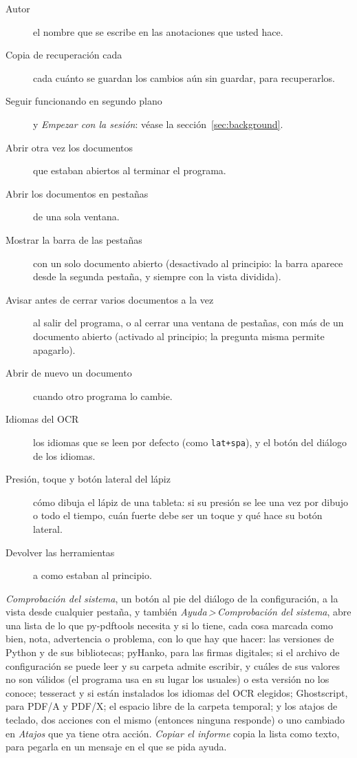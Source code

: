 \documentclass[12pt,
              article,
              oneside
              ]{memoir}
\newcommand*{\menu}[1]{\textit{#1}}
\newcommand*{\then}{\,>\,}
\begin{document}
%
\begin{description}
\item[Autor] el nombre que se escribe en las anotaciones que usted hace.
\item[Copia de recuperación cada] cada cuánto se guardan los cambios aún
  sin guardar, para recuperarlos.
\item[Seguir funcionando en segundo plano] y \textup{\textit{Empezar con la
  sesión}}: véase la sección~\ref{sec:background}.
\item[Abrir otra vez los documentos] que estaban abiertos al terminar el
  programa.
\item[Abrir los documentos en pestañas] de una sola ventana.
\item[Mostrar la barra de las pestañas] con un solo documento abierto
  (desactivado al principio: la barra aparece desde la segunda pestaña, y
  siempre con la vista dividida).
\item[Avisar antes de cerrar varios documentos a la vez] al salir del
  programa, o al cerrar una ventana de pestañas, con más de un documento
  abierto (activado al principio; la pregunta misma permite apagarlo).
\item[Abrir de nuevo un documento] cuando otro programa lo cambie.
\item[Idiomas del OCR] los idiomas que se leen por defecto (como
  \texttt{lat+spa}), y el botón del diálogo de los idiomas.
\item[Presión, toque y botón lateral del lápiz] cómo dibuja el lápiz de una
  tableta: si su presión se lee una vez por dibujo o todo el tiempo, cuán
  fuerte debe ser un toque y qué hace su botón lateral.
\item[Devolver las herramientas] a como estaban al principio.
\end{description}

%
\menu{Comprobación del sistema}, un botón al pie del diálogo de la
configuración, a la vista desde cualquier pestaña, y también
\menu{Ayuda\then Comprobación del sistema}, abre una lista de lo que
py-pdftools
necesita y si lo tiene, cada cosa marcada como bien, nota, advertencia o
problema, con lo que hay que hacer: las versiones de Python y de sus
bibliotecas; pyHanko, para las firmas digitales; si el archivo de
configuración se puede leer y su carpeta admite escribir, y cuáles de sus
valores no son válidos (el programa usa en su lugar los usuales) o esta
versión no los conoce; tesseract y si están instalados los idiomas del
OCR elegidos; Ghostscript, para PDF/A y PDF/X; el espacio libre de la
carpeta temporal; y los atajos de teclado, dos acciones con el mismo
(entonces ninguna responde) o uno cambiado en \menu{Atajos} que ya tiene
otra acción. \menu{Copiar el informe} copia la lista como texto, para
pegarla en un mensaje en el que se pida ayuda.
\end{document}
